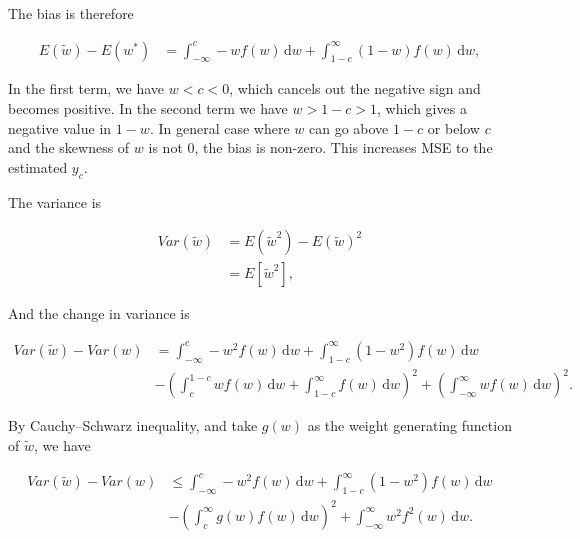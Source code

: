 \documentclass[]{article}
\begin{document}
The bias is therefore

\begin{equation}
\label{eqn: bias w trunc}
\begin{aligned}
E(\tilde{w}) - E(w^*) &= \int_{-\infty}^{c} -wf(w)\,\mathrm{d}w+\int_{1-c}^{\infty} (1-w)f(w)\,\mathrm{d}w,
\end{aligned}
\end{equation}

In the first term, we have \(w<c<0\), which cancels out the negative
sign and becomes positive. In the second term we have \(w>1-c>1\), which
gives a negative value in \(1-w\). In general case where \(w\) can go
above \(1-c\) or below \(c\) and the skewness of \(w\) is not 0, the
bias is non-zero. This increases MSE to the estimated \(y_c\).

The variance is

\begin{equation}
\label{eqn: var w trunc}
\begin{aligned}
Var(\tilde{w}) &= E(\tilde{w}^{2})-E(\tilde{w})^2\\
&=E[\tilde{w}^2],
\end{aligned}
\end{equation}

And the change in variance is

\begin{equation}
\label{eqn: delta var w trunc 1}
\begin{aligned}
Var(\tilde{w}) - Var(w) &=\int_{-\infty}^{c} -w^2f(w)\,\mathrm{d}w+\int_{1-c}^{\infty} (1-w^2)f(w)\,\mathrm{d}w \\
& - (\int_c^{1-c} wf(w)\,\mathrm{d}w + \int_{1-c}^{\infty} f(w)\,\mathrm{d}w)^2 + (\int_{-\infty}^{\infty} wf(w)\,\mathrm{d}w)^2.
\end{aligned}
\end{equation}

By Cauchy--Schwarz inequality, and take \(g(w)\) as the weight
generating function of \(\tilde{w}\), we have

\begin{equation}
\label{eqn: delta var w trunc 2}
\begin{aligned}
Var(\tilde{w}) - Var(w) &\leq \int_{-\infty}^{c} -w^2f(w)\,\mathrm{d}w+\int_{1-c}^{\infty} (1-w^2)f(w)\,\mathrm{d}w \\
& - (\int_c^{\infty} g(w)f(w)\,\mathrm{d}w)^2 + \int_{-\infty}^{\infty} w^2f^2(w)\,\mathrm{d}w.
\end{aligned}
\end{equation}
\end{document}
